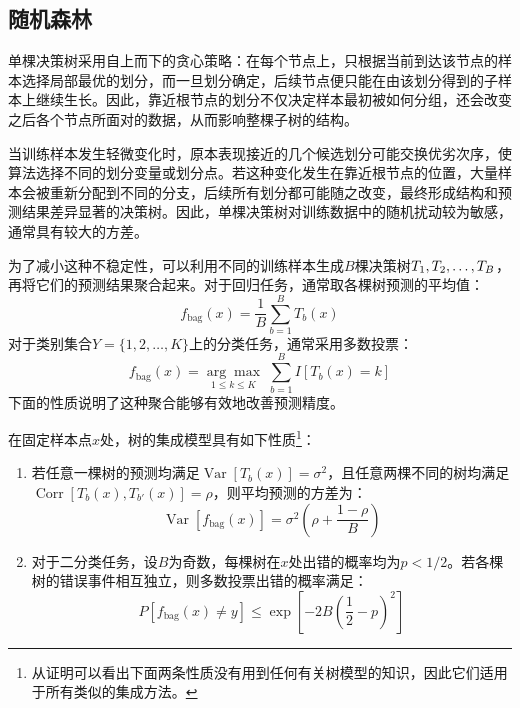 \subsection{随机森林}
单棵决策树采用自上而下的贪心策略：在每个节点上，只根据当前到达该节点的样本选择局部最优的划分，而一旦划分确定，后续节点便只能在由该划分得到的子样本上继续生长。因此，靠近根节点的划分不仅决定样本最初被如何分组，还会改变之后各个节点所面对的数据，从而影响整棵子树的结构。\par
当训练样本发生轻微变化时，原本表现接近的几个候选划分可能交换优劣次序，使算法选择不同的划分变量或划分点。若这种变化发生在靠近根节点的位置，大量样本会被重新分配到不同的分支，后续所有划分都可能随之改变，最终形成结构和预测结果差异显著的决策树。因此，单棵决策树对训练数据中的随机扰动较为敏感，通常具有较大的方差。\par
为了减小这种不稳定性，可以利用不同的训练样本生成$B$棵决策树$T_1, T_2, \dots, T_{B}$，再将它们的预测结果聚合起来。对于回归任务，通常取各棵树预测的平均值：
\begin{equation*}
	f_{\mathrm{bag}}(x)=\frac{1}{B}\sum_{b=1}^{B}T_b(x)
\end{equation*}
对于类别集合$Y=\{1,2,\dots,K\}$上的分类任务，通常采用多数投票：
\begin{equation*}
	f_{\mathrm{bag}}(x)=\underset{1\leqslant k\leqslant K}{\arg\max}\;
	\sum_{b=1}^{B}I[T_b(x)=k]
\end{equation*}
下面的性质说明了这种聚合能够有效地改善预测精度。
\begin{property}\label{prop:TreeEnsemble}
	在固定样本点$x$处，树的集成模型具有如下性质\footnote{从证明可以看出下面两条性质没有用到任何有关树模型的知识，因此它们适用于所有类似的集成方法。}：
	\begin{enumerate}
		\item 若任意一棵树的预测均满足$\operatorname{Var}[T_b(x)]=\sigma^2$，且任意两棵不同的树均满足$\operatorname{Corr}[T_b(x),T_{b'}(x)]=\rho$，则平均预测的方差为：
		\begin{equation*}
			\operatorname{Var}[f_{\mathrm{bag}}(x)]=\sigma^2\left(\rho+\frac{1-\rho}{B}\right)
		\end{equation*}
		\item 对于二分类任务，设$B$为奇数，每棵树在$x$处出错的概率均为$p<1/2$。若各棵树的错误事件相互独立，则多数投票出错的概率满足：
		\begin{equation*}
			P[f_{\mathrm{bag}}(x)\ne y]\leqslant\exp\left[-2B\left(\frac{1}{2}-p\right)^2\right]
		\end{equation*}
	\end{enumerate}
\end{property}
